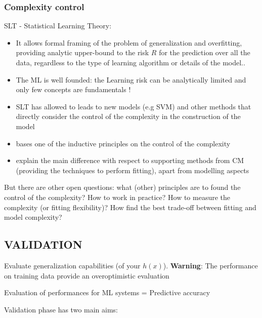 \documentclass[../main.tex]{subfiles}
\begin{document}
\subsubsection{Complexity control}
SLT - Statistical Learning Theory:
\begin{itemize}
    \item It allows formal framing of the problem of generalization and overfitting, providing analytic upper-bound to the risk $R$ for the prediction over all the data, regardless to the type of learning algorithm or details of the model..
    
    \item The ML is well founded: the Learning risk can be analytically limited and only few concepts are fundamentals !
    
    \item SLT has allowed to leads to new models (e.g SVM) and other methods that directly consider the control of the complexity in the construction of the model
    
    \item bases one of the inductive principles on the control of the complexity
    
    \item explain the main difference with respect to supporting methods from CM (providing
the techniques to perform fitting), apart from modelling aspects
\end{itemize}

But there are other open questions: what (other) principles are to found the control of the complexity? How to work in practice? How to measure the complexity (or fitting flexibility)? How find the best trade-off between fitting and model complexity?

\subsection{VALIDATION}
Evaluate generalization capabilities (of your $h(x)$). \textbf{Warning}: The performance on training data provide an overoptimistic evaluation
\begin{center}
    Evaluation of performances for ML systems = Predictive accuracy
\end{center}

Validation phase has two main aims:
\end{document}

